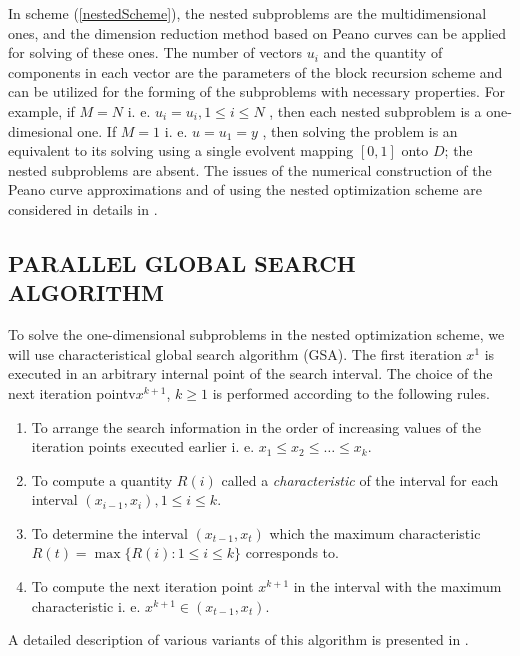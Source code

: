 \documentclass{aip-cp}
\begin{document}
In scheme (\ref{nestedScheme}), the nested subproblems are the multidimensional ones, and the dimension reduction method based on Peano curves can be applied for solving of these ones. The number of vectors $u_i$ and the quantity of components in each vector are the parameters of the block recursion scheme and can be utilized for the forming of the subproblems with necessary properties. For example, if $M=N$ i. e. $u_i=u_i,1\leqslant i\leqslant N$ , then each nested subproblem is a one-dimesional one. If $M=1$ i. e. $u=u_1=y$ , then solving the problem is an equivalent to its solving using a single evolvent mapping $[0,1]$ onto $D$; the nested subproblems are absent.
The issues of the numerical construction of the Peano curve approximations and of using the nested optimization scheme are considered in details in \citep{recogAppl,determApproaches}.

\subsection{PARALLEL GLOBAL SEARCH ALGORITHM}
To solve the one-dimensional subproblems in the nested optimization scheme, we will use characteristical global search algorithm (GSA).
The first iteration $x^1$ is executed in an arbitrary internal point of the search interval. The choice of the next iteration pointv$x^{k+1}$, $k\geqslant 1$ is performed according to the following rules.

\begin{enumerate}
\item To arrange the search information in the order of increasing values of the iteration points executed earlier i. e. $x_1\leqslant x_2 \leqslant \dots \leqslant x_k$.
\item To compute a quantity $R(i)$ called a \textit{characteristic} of the interval for each interval $(x_{i-1},x_i),1\leqslant i \leqslant k$.
\item To determine the interval $(x_{t-1},x_t)$ which the maximum characteristic $R(t)=\max{\{R(i): 1\leqslant i \leqslant k}\}$ corresponds to.
\item To compute the next iteration point $x^{k+1}$ in the interval with the maximum characteristic i. e. $x^{k+1}\in (x_{t-1},x_t)$.
\end{enumerate}

A detailed description of various variants of this algorithm is presented in \cite{strongSerg,gergelDerivMethod,branchBoundAlg,barkAdaptConstr}.
\end{document}
